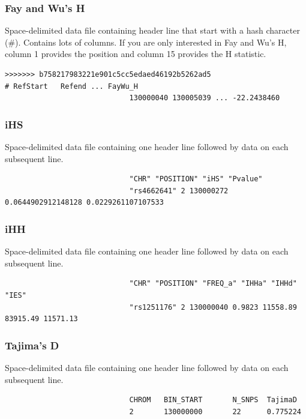 \documentclass[a4paper,10pt]{article}
\begin{document}
                             \subsubsection{Fay and Wu's H}
                             Space-delimited data file containing header line that start with a hash character (\#). Contains lots of columns. If you are only interested in Fay and Wu's H, column 1 provides the position and column 15 provides the H statistic. \\
                             \begin{verbatim}
>>>>>>> b758217983221e901c5cc5edaed46192b5262ad5
# RefStart   Refend ... FayWu_H
                             130000040 130005039 ... -22.2438460
                             \end{verbatim}
                             \subsubsection{iHS}
                             Space-delimited data file containing one header line followed by data on each subsequent line.\\
                             \begin{verbatim}
                             "CHR" "POSITION" "iHS" "Pvalue"
                             "rs4662641" 2 130000272 0.0644902912148128 0.0229261107107533
                             \end{verbatim}
                             \subsubsection{iHH}
                             Space-delimited data file containing one header line followed by data on each subsequent line.\\
                             \begin{verbatim}
                             "CHR" "POSITION" "FREQ_a" "IHHa" "IHHd" "IES"
                             "rs1251176" 2 130000040 0.9823 11558.89 83915.49 11571.13
                             \end{verbatim}
                             \subsubsection{Tajima's D}
                             Space-delimited data file containing one header line followed by data on each subsequent line.\\
                             \begin{verbatim}
                             CHROM   BIN_START       N_SNPS  TajimaD
                             2       130000000       22      0.775224
                             \end{verbatim}
\end{document}
